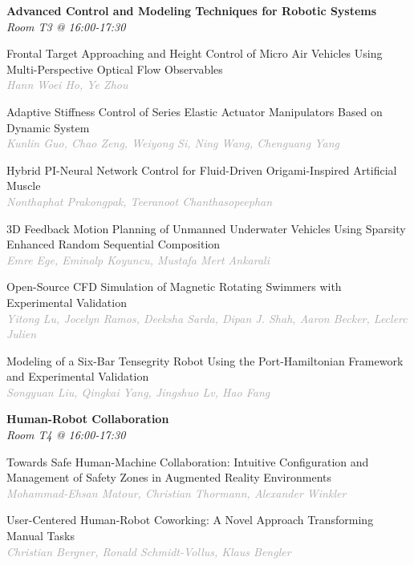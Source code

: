 \begin{multicols*}{2}
\normalsize \textbf{Advanced Control and Modeling Techniques for Robotic Systems}\\
\small \textit{Room T3 @ 16:00-17:30}

\small Frontal Target Approaching and Height Control of Micro Air Vehicles Using Multi-Perspective Optical Flow Observables\\ 
\footnotesize \textcolor{darkgray}{\textit{Hann Woei Ho, Ye  Zhou}}

\small Adaptive Stiffness Control of Series Elastic Actuator Manipulators Based on Dynamic System\\ 
\footnotesize \textcolor{darkgray}{\textit{Kunlin Guo, Chao  Zeng, Weiyong  Si, Ning  Wang, Chenguang  Yang}}

\small Hybrid PI-Neural Network Control for Fluid-Driven Origami-Inspired Artificial Muscle\\ 
\footnotesize \textcolor{darkgray}{\textit{Nonthaphat Prakongpak, Teeranoot  Chanthasopeephan}}

\small 3D Feedback Motion Planning of Unmanned Underwater Vehicles Using Sparsity Enhanced Random Sequential Composition\\ 
\footnotesize \textcolor{darkgray}{\textit{Emre Ege, Eminalp  Koyuncu, Mustafa Mert  Ankarali}}

\small Open-Source CFD Simulation of Magnetic Rotating Swimmers with Experimental Validation\\ 
\footnotesize \textcolor{darkgray}{\textit{Yitong Lu, Jocelyn  Ramos, Deeksha  Sarda, Dipan J.  Shah, Aaron  Becker, Leclerc  Julien}}

\small Modeling of a Six-Bar Tensegrity Robot Using the Port-Hamiltonian Framework and Experimental Validation\\ 
\footnotesize \textcolor{darkgray}{\textit{Songyuan Liu, Qingkai  Yang, Jingshuo  Lv, Hao  Fang}}

\normalsize \textbf{Human-Robot Collaboration}\\
\small \textit{Room T4 @ 16:00-17:30}

\small Towards Safe Human-Machine Collaboration: Intuitive Configuration and Management of Safety Zones in Augmented Reality Environments\\ 
\footnotesize \textcolor{darkgray}{\textit{Mohammad-Ehsan Matour, Christian  Thormann, Alexander  Winkler}}

\small User-Centered Human-Robot Coworking: A Novel Approach Transforming Manual Tasks\\ 
\footnotesize \textcolor{darkgray}{\textit{Christian Bergner, Ronald  Schmidt-Vollus, Klaus  Bengler}}


\end{multicols*}
